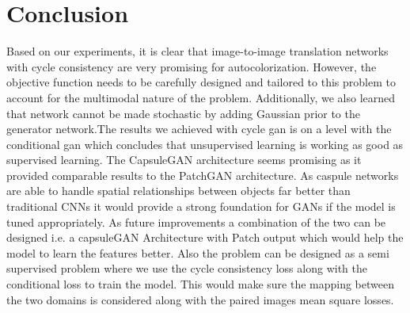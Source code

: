 \documentclass{article} %
\begin{document}
\section{Conclusion}
Based on our experiments, it is clear that image-to-image translation networks with cycle consistency are very promising for autocolorization. However, the objective function needs to be carefully designed and tailored to this problem to account for the multimodal nature of the problem. Additionally, we also learned that network cannot be made stochastic by adding Gaussian prior to the generator network.The results we achieved with cycle gan is on a level with the conditional gan which concludes that unsupervised learning is working as good as supervised learning. The CapsuleGAN architecture seems promising as it provided comparable results to the PatchGAN architecture. As caspule networks are able to handle spatial relationships between objects far better than traditional CNNs it would provide a strong foundation for GANs if the model is tuned appropriately. As future improvements a combination of the two can be designed i.e. a capsuleGAN Architecture with Patch output which would help the model to learn the features better. Also the problem can be designed as a semi supervised problem where we use the cycle consistency loss along with the conditional loss to train the model. This would make sure the mapping between the two domains is considered along with the paired images mean square losses. 
\end{document}
